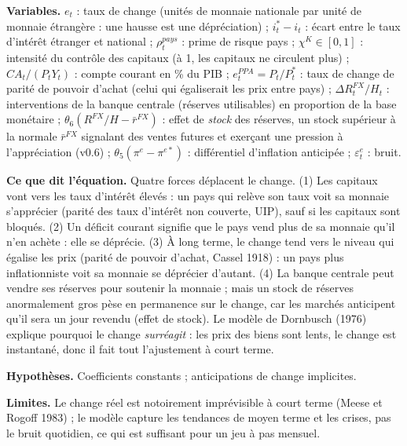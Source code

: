 \documentclass[11pt,a4paper]{article}
\newcommand{\variables}{\par\noindent\textbf{Variables.} }
\newcommand{\sens}{\par\noindent\textbf{Ce que dit l'équation.} }
\newcommand{\hyp}{\par\noindent\textbf{Hypothèses.} }
\newcommand{\limites}{\par\noindent\textbf{Limites.} }
\begin{document}
\begin{lecture}
\variables $e_t$ : taux de change (unités de monnaie nationale par unité de monnaie étrangère : une hausse est une dépréciation) ; $i^\ast_t-i_t$ : écart entre le taux d'intérêt étranger et national ; $\rho^{pays}_t$ : prime de risque pays ; $\chi^K\in[0,1]$ : intensité du contrôle des capitaux (à 1, les capitaux ne circulent plus) ; $CA_t/(P_tY_t)$ : compte courant en \% du PIB ; $e^{PPA}_t=P_t/P^\ast_t$ : taux de change de parité de pouvoir d'achat (celui qui égaliserait les prix entre pays) ; $\Delta R^{FX}_t/H_t$ : interventions de la banque centrale (réserves utilisables) en proportion de la base monétaire ; $\theta_6(R^{FX}/H-\bar r^{FX})$ : effet de \emph{stock} des réserves, un stock supérieur à la normale $\bar r^{FX}$ signalant des ventes futures et exerçant une pression à l'appréciation (v0.6) ; $\theta_5(\pi^e-\pi^{e\ast})$ : différentiel d'inflation anticipée ; $\varepsilon^e_t$ : bruit.
\sens Quatre forces déplacent le change. (1) Les capitaux vont vers les taux d'intérêt élevés : un pays qui relève son taux voit sa monnaie s'apprécier (parité des taux d'intérêt non couverte, UIP), sauf si les capitaux sont bloqués. (2) Un déficit courant signifie que le pays vend plus de sa monnaie qu'il n'en achète : elle se déprécie. (3) À long terme, le change tend vers le niveau qui égalise les prix (parité de pouvoir d'achat, Cassel 1918) : un pays plus inflationniste voit sa monnaie se déprécier d'autant. (4) La banque centrale peut vendre ses réserves pour soutenir la monnaie ; mais un stock de réserves anormalement gros pèse en permanence sur le change, car les marchés anticipent qu'il sera un jour revendu (effet de stock). Le modèle de Dornbusch (1976) explique pourquoi le change \emph{surréagit} : les prix des biens sont lents, le change est instantané, donc il fait tout l'ajustement à court terme.
\hyp Coefficients constants ; anticipations de change implicites.
\limites Le change réel est notoirement imprévisible à court terme (Meese et Rogoff 1983) ; le modèle capture les tendances de moyen terme et les crises, pas le bruit quotidien, ce qui est suffisant pour un jeu à pas mensuel.

\end{lecture}
\end{document}
